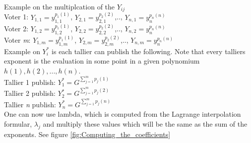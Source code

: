 \noindent
Example on the multiplcation of the $Y_{ij}$\\
Voter 1: \begin{math}Y_{1,1}=y_{1,1}^{p_1(1)} \end{math}, \begin{math}Y_{2,1}=y_{2,1}^{p_2(2)} \end{math},.., \begin{math}Y_{n,1}=y_n^{p_n(n)} \end{math}\\
Voter 2: \begin{math}Y_{1,2}=y_{1,2}^{p_1(1)} \end{math}, \begin{math}Y_{2,2}=y_{2,2}^{p_2(2)} \end{math},.., \begin{math}Y_{n,2}=y_n^{p_n(n)} \end{math}\\
Voter \textit{m}: \begin{math}Y_{1,m}=y_{1,m}^{p_1(1)} \end{math}, \begin{math}Y_{2,m}=y_{2,m}^{p_2(2)} \end{math},.., \begin{math}Y_{n,m}=y_n^{p_n(n)} \end{math}\\

\noindent
Example on $Y_i^*$ is each tallier can publish the following. Note that every talliers exponent is the evaluation in some point in a given polynomium \begin{math}h(1), h(2),..., h(n) \end{math}.\\
Tallier 1 publish: \begin{math}Y_1^* = G^{ \sum\limits_{j=1}^m p_j(1)}   \end{math}\\
Tallier 2 publish: \begin{math}Y_2^* = G^{ \sum\limits_{j=1}^m p_j(2)}   \end{math}\\
Tallier \textit{n} publish: \begin{math}Y_n^* = G^{ \sum\limits_{j=1}^m p_j(n)}  \end{math}\\


 One can now use lambda, which is computed from the  Lagrange interpolation formular, \begin{math} \lambda_j \end{math} and multiply these values which will be the same as the sum of the exponents. See figure \ref{fig:Computing_the_coefficients} \\

